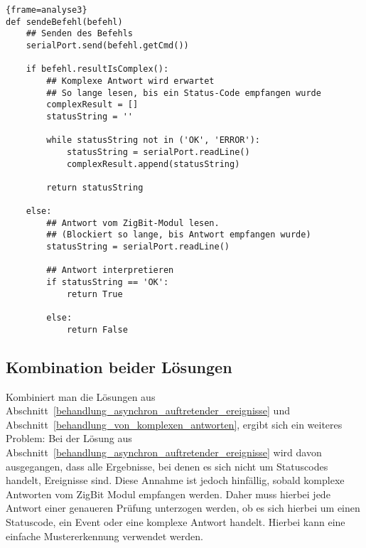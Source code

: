             \begin{lstlisting}{frame=analyse3}
def sendeBefehl(befehl)
    ## Senden des Befehls
    serialPort.send(befehl.getCmd())

    if befehl.resultIsComplex():
        ## Komplexe Antwort wird erwartet
        ## So lange lesen, bis ein Status-Code empfangen wurde
        complexResult = []
        statusString = ''

        while statusString not in ('OK', 'ERROR'):
            statusString = serialPort.readLine()
            complexResult.append(statusString)

        return statusString

    else:
        ## Antwort vom ZigBit-Modul lesen.
        ## (Blockiert so lange, bis Antwort empfangen wurde)
        statusString = serialPort.readLine()

        ## Antwort interpretieren
        if statusString == 'OK':
            return True
        
        else:
            return False

            \end{lstlisting}

        \subsection{Kombination beider Lösungen}

        Kombiniert man die Lösungen aus Abschnitt~\ref{behandlung_asynchron_auftretender_ereignisse} und 
        Abschnitt~\ref{behandlung_von_komplexen_antworten}, ergibt sich ein weiteres Problem: Bei der
        Lösung aus Abschnitt~\ref{behandlung_asynchron_auftretender_ereignisse} wird davon ausgegangen, 
        dass alle Ergebnisse, bei denen es sich nicht um Statuscodes handelt, Ereignisse sind. Diese Annahme
        ist jedoch hinfällig, sobald komplexe Antworten vom ZigBit Modul empfangen werden. Daher muss hierbei
        jede Antwort einer genaueren Prüfung unterzogen werden, ob es sich hierbei um einen Statuscode, 
        ein Event oder eine komplexe Antwort handelt. Hierbei kann eine einfache Mustererkennung verwendet
        werden.


